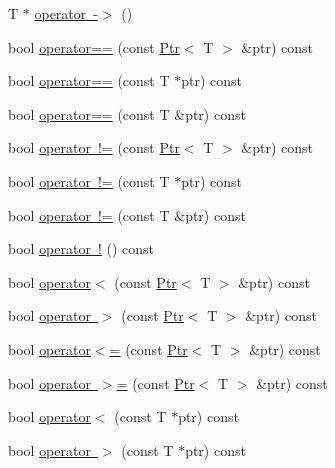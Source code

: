 \begin{DoxyCompactItemize}
\item 
T $\ast$ \mbox{\hyperlink{classpdl_1_1memory_1_1_ptr_ad42b7c2213bd8e3f335ad38251c0f083}{operator -\/$>$}} ()
\item 
bool \mbox{\hyperlink{classpdl_1_1memory_1_1_ptr_a2e84f62cdec019db0c2defb770250844}{operator==}} (const \mbox{\hyperlink{classpdl_1_1memory_1_1_ptr}{Ptr}}$<$ T $>$ \&ptr) const
\item 
bool \mbox{\hyperlink{classpdl_1_1memory_1_1_ptr_a99f3c935c66f98f111b3188844e97912}{operator==}} (const T $\ast$ptr) const
\item 
bool \mbox{\hyperlink{classpdl_1_1memory_1_1_ptr_accd2d4929842d4f80712fc903f42955b}{operator==}} (const T \&ptr) const
\item 
bool \mbox{\hyperlink{classpdl_1_1memory_1_1_ptr_aabaecb678b461726b9d54530fb9ae07d}{operator !=}} (const \mbox{\hyperlink{classpdl_1_1memory_1_1_ptr}{Ptr}}$<$ T $>$ \&ptr) const
\item 
bool \mbox{\hyperlink{classpdl_1_1memory_1_1_ptr_a76233742f086f5073c151315747f44ce}{operator !=}} (const T $\ast$ptr) const
\item 
bool \mbox{\hyperlink{classpdl_1_1memory_1_1_ptr_abf0da7bee42946f4f3e191b738e9876e}{operator !=}} (const T \&ptr) const
\item 
bool \mbox{\hyperlink{classpdl_1_1memory_1_1_ptr_a54450a833ab5b28daa0983734f3fcc62}{operator !}} () const
\item 
bool \mbox{\hyperlink{classpdl_1_1memory_1_1_ptr_a5e5e9928eaa3a78ecb75e788178db476}{operator$<$}} (const \mbox{\hyperlink{classpdl_1_1memory_1_1_ptr}{Ptr}}$<$ T $>$ \&ptr) const
\item 
bool \mbox{\hyperlink{classpdl_1_1memory_1_1_ptr_abee5d21b0ff9e434b75d25ac9e09c572}{operator $>$}} (const \mbox{\hyperlink{classpdl_1_1memory_1_1_ptr}{Ptr}}$<$ T $>$ \&ptr) const
\item 
bool \mbox{\hyperlink{classpdl_1_1memory_1_1_ptr_a30780418a5a58e49688245295edd93fb}{operator$<$=}} (const \mbox{\hyperlink{classpdl_1_1memory_1_1_ptr}{Ptr}}$<$ T $>$ \&ptr) const
\item 
bool \mbox{\hyperlink{classpdl_1_1memory_1_1_ptr_aaee16e2f89454046ab174ddfa7de4a38}{operator $>$=}} (const \mbox{\hyperlink{classpdl_1_1memory_1_1_ptr}{Ptr}}$<$ T $>$ \&ptr) const
\item 
bool \mbox{\hyperlink{classpdl_1_1memory_1_1_ptr_a3e7661f4abf0fd7c63bde842a12ef737}{operator$<$}} (const T $\ast$ptr) const
\item 
bool \mbox{\hyperlink{classpdl_1_1memory_1_1_ptr_a01e7b84c335364635b2ad0f0bc8355a5}{operator $>$}} (const T $\ast$ptr) const

\end{DoxyCompactItemize}

